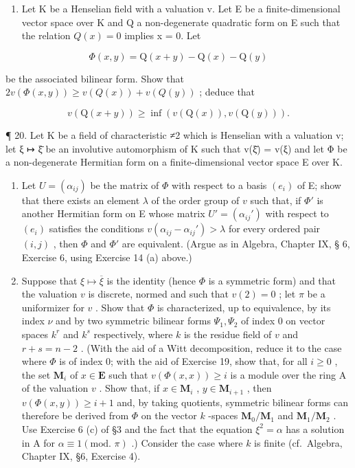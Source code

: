 \begin{enumerate}
\def\labelenumi{\arabic{enumi}.}
\setcounter{enumi}{18}
\tightlist
\item
  Let K be a Henselian field with a valuation v. Let E be a finite-dimensional vector space over K and Q a non-degenerate quadratic form on E such that the relation \(Q(x) = 0\) implies x = 0. Let
\end{enumerate}

\[
\Phi (x, y) = \mathrm{Q} (x + y) - \mathrm{Q} (x) - \mathrm{Q} (y)
\]

be the associated bilinear form. Show that \(2v(\Phi(x,y)) \geqslant v(Q(x)) + v(Q(y))\) ; deduce that

\[
v (\mathrm{Q} (x + y)) \geqslant \inf (v (\mathrm{Q} (x)), v (\mathrm{Q} (y))).
\]

¶ 20. Let K be a field of characteristic ≠2 which is Henselian with a valuation v; let ξ ↦ ξ̄ be an involutive automorphism of K such that v(ξ̄) = v(ξ) and let Φ be a non-degenerate Hermitian form on a finite-dimensional vector space E over K.

\begin{enumerate}
\def\labelenumi{(\alph{enumi})}
\item
  Let \(U = (\alpha_{ij})\) be the matrix of \(\Phi\) with respect to a basis \((e_i)\) of E; show that there exists an element \(\lambda\) of the order group of \(v\) such that, if \(\Phi'\) is another Hermitian form on E whose matrix \(U' = (\alpha_{ij}')\) with respect to \((e_i)\) satisfies the conditions \(v(\alpha_{ij} - \alpha_{ij}') > \lambda\) for every ordered pair \((i,j)\) , then \(\Phi\) and \(\Phi'\) are equivalent. (Argue as in Algebra, Chapter IX, § 6, Exercise 6, using Exercise 14 (a) above.)
\item
  Suppose that \(\xi \mapsto \overline{\xi}\) is the identity (hence \(\Phi\) is a symmetric form) and that the valuation \(v\) is discrete, normed and such that \(v(2) = 0\) ; let \(\pi\) be a uniformizer for \(v\) . Show that \(\Phi\) is characterized, up to equivalence, by its index \(\nu\) and by two symmetric bilinear forms \(\Psi_1, \Psi_2\) of index 0 on vector spaces \(k^r\) and \(k^s\) respectively, where \(k\) is the residue field of \(v\) and \(r + s = n - 2\) . (With the aid of a Witt decomposition, reduce it to the case where \(\Phi\) is of index 0; with the aid of Exercise 19, show that, for all \(i \geqslant 0\) , the set \(\mathbf{M}_i\) of \(x \in \mathbf{E}\) such that \(v(\Phi(x, x)) \geqslant i\) is a module over the ring A of the valuation \(v\) . Show that, if \(x \in \mathbf{M}_i\) , \(y \in \mathbf{M}_{i+1}\) , then \(v(\Phi(x, y)) \geqslant i + 1\) and, by taking quotients, symmetric bilinear forms can therefore be derived from \(\Phi\) on the vector \(k\) -spaces \(\mathbf{M}_0 / \mathbf{M}_1\) and \(\mathbf{M}_1 / \mathbf{M}_2\) . Use Exercise 6 (c) of §3 and the fact that the equation \(\xi^2 = \alpha\) has a solution in A for \(\alpha \equiv 1 (\text{mod. } \pi)\) .) Consider the case where \(k\) is finite (cf.~Algebra, Chapter IX, §6, Exercise 4).
\end{enumerate}

